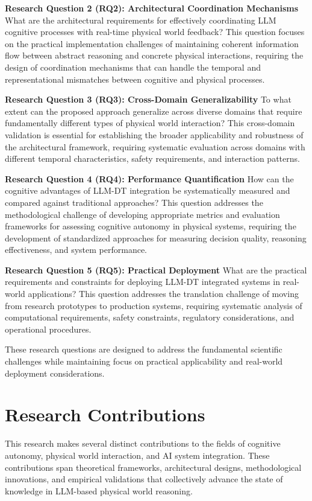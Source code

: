 \textbf{Research Question 2 (RQ2): Architectural Coordination Mechanisms}
What are the architectural requirements for effectively coordinating LLM cognitive processes with real-time physical world feedback? This question focuses on the practical implementation challenges of maintaining coherent information flow between abstract reasoning and concrete physical interactions, requiring the design of coordination mechanisms that can handle the temporal and representational mismatches between cognitive and physical processes.

\textbf{Research Question 3 (RQ3): Cross-Domain Generalizability}
To what extent can the proposed approach generalize across diverse domains that require fundamentally different types of physical world interaction? This cross-domain validation is essential for establishing the broader applicability and robustness of the architectural framework, requiring systematic evaluation across domains with different temporal characteristics, safety requirements, and interaction patterns.

\textbf{Research Question 4 (RQ4): Performance Quantification}
How can the cognitive advantages of LLM-DT integration be systematically measured and compared against traditional approaches? This question addresses the methodological challenge of developing appropriate metrics and evaluation frameworks for assessing cognitive autonomy in physical systems, requiring the development of standardized approaches for measuring decision quality, reasoning effectiveness, and system performance.

\textbf{Research Question 5 (RQ5): Practical Deployment}
What are the practical requirements and constraints for deploying LLM-DT integrated systems in real-world applications? This question addresses the translation challenge of moving from research prototypes to production systems, requiring systematic analysis of computational requirements, safety constraints, regulatory considerations, and operational procedures.

These research questions are designed to address the fundamental scientific challenges while maintaining focus on practical applicability and real-world deployment considerations.

\section{Research Contributions}

This research makes several distinct contributions to the fields of cognitive autonomy, physical world interaction, and AI system integration. These contributions span theoretical frameworks, architectural designs, methodological innovations, and empirical validations that collectively advance the state of knowledge in LLM-based physical world reasoning.

